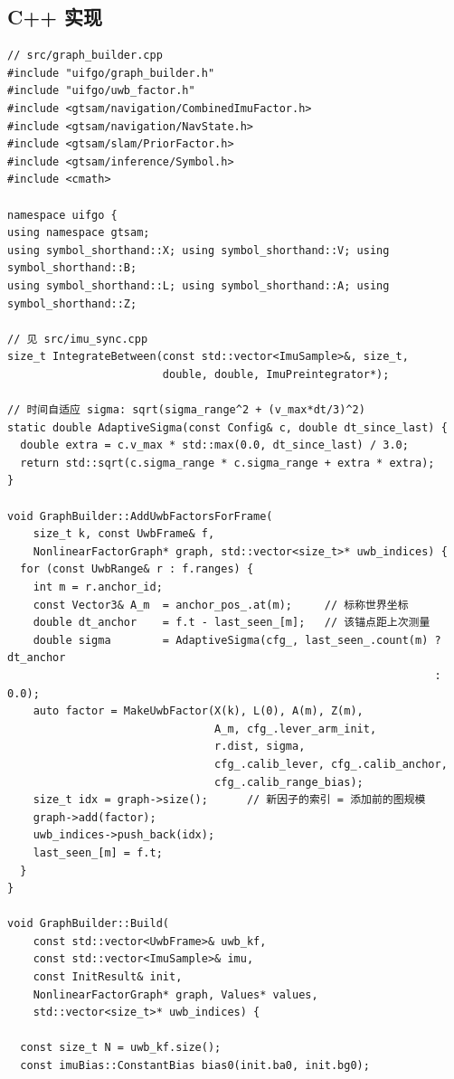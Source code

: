 \documentclass[11pt,a4paper]{report}
\begin{document}
\subsection{C++ 实现}
\begin{lstlisting}[style=cpp]
// src/graph_builder.cpp
#include "uifgo/graph_builder.h"
#include "uifgo/uwb_factor.h"
#include <gtsam/navigation/CombinedImuFactor.h>
#include <gtsam/navigation/NavState.h>
#include <gtsam/slam/PriorFactor.h>
#include <gtsam/inference/Symbol.h>
#include <cmath>

namespace uifgo {
using namespace gtsam;
using symbol_shorthand::X; using symbol_shorthand::V; using symbol_shorthand::B;
using symbol_shorthand::L; using symbol_shorthand::A; using symbol_shorthand::Z;

// 见 src/imu_sync.cpp
size_t IntegrateBetween(const std::vector<ImuSample>&, size_t,
                        double, double, ImuPreintegrator*);

// 时间自适应 sigma: sqrt(sigma_range^2 + (v_max*dt/3)^2)
static double AdaptiveSigma(const Config& c, double dt_since_last) {
  double extra = c.v_max * std::max(0.0, dt_since_last) / 3.0;
  return std::sqrt(c.sigma_range * c.sigma_range + extra * extra);
}

void GraphBuilder::AddUwbFactorsForFrame(
    size_t k, const UwbFrame& f,
    NonlinearFactorGraph* graph, std::vector<size_t>* uwb_indices) {
  for (const UwbRange& r : f.ranges) {
    int m = r.anchor_id;
    const Vector3& A_m  = anchor_pos_.at(m);     // 标称世界坐标
    double dt_anchor    = f.t - last_seen_[m];   // 该锚点距上次测量
    double sigma        = AdaptiveSigma(cfg_, last_seen_.count(m) ? dt_anchor
                                                                  : 0.0);
    auto factor = MakeUwbFactor(X(k), L(0), A(m), Z(m),
                                A_m, cfg_.lever_arm_init,
                                r.dist, sigma,
                                cfg_.calib_lever, cfg_.calib_anchor,
                                cfg_.calib_range_bias);
    size_t idx = graph->size();      // 新因子的索引 = 添加前的图规模
    graph->add(factor);
    uwb_indices->push_back(idx);
    last_seen_[m] = f.t;
  }
}

void GraphBuilder::Build(
    const std::vector<UwbFrame>& uwb_kf,
    const std::vector<ImuSample>& imu,
    const InitResult& init,
    NonlinearFactorGraph* graph, Values* values,
    std::vector<size_t>* uwb_indices) {

  const size_t N = uwb_kf.size();
  const imuBias::ConstantBias bias0(init.ba0, init.bg0);


\end{lstlisting}
\end{document}
